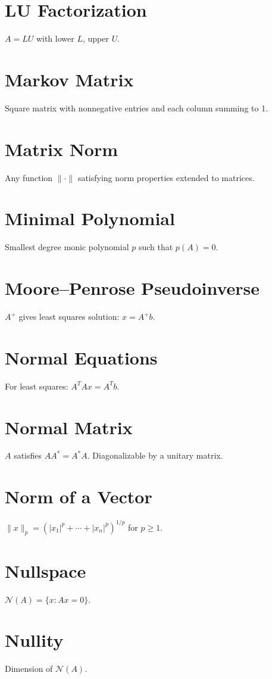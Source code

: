 \documentclass[12pt]{book}
\begin{document}
\chapter{LU Factorization}
$A=LU$ with lower $L$, upper $U$.

\chapter{Markov Matrix}
Square matrix with nonnegative entries and each column summing to 1.

\chapter{Matrix Norm}
Any function $\|\cdot\|$ satisfying norm properties extended to matrices.

\chapter{Minimal Polynomial}
Smallest degree monic polynomial $p$ such that $p(A)=0$.

\chapter{Moore--Penrose Pseudoinverse}
$A^+$ gives least squares solution: $x=A^+ b$.

\chapter{Normal Equations}
For least squares: $A^T A x = A^T b$.

\chapter{Normal Matrix}
$A$ satisfies $AA^* = A^* A$. Diagonalizable by a unitary matrix.

\chapter{Norm of a Vector}
$\|x\|_p = (|x_1|^p + \cdots + |x_n|^p)^{1/p}$ for $p \geq 1$.

\chapter{Nullspace}
$\mathcal{N}(A) = \{x : Ax=0\}$.

\chapter{Nullity}
Dimension of $\mathcal{N}(A)$.
\end{document}

